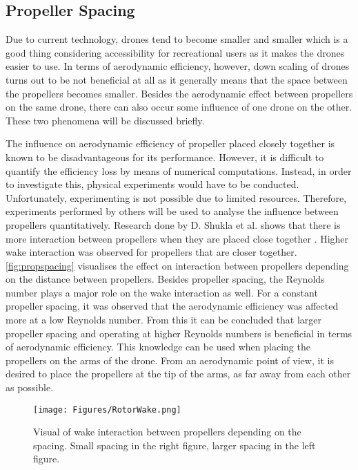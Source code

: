 \subsection{Propeller Spacing}
\label{subsec:propspacing}
Due to current technology, drones tend to become smaller and smaller which is a good thing considering accessibility for recreational users as it makes the drones easier to use. In terms of aerodynamic efficiency, however, down scaling of drones turns out to be not beneficial at all as it generally means that the space between the propellers becomes smaller. Besides the aerodynamic effect between propellers on the same drone, there can also occur some influence of one drone on the other. These two phenomena will be discussed briefly.

The influence on aerodynamic efficiency of propeller placed closely together is known to be disadvantageous for its performance. However, it is difficult to quantify the efficiency loss by means of numerical computations. Instead, in order to investigate this, physical experiments would have to be conducted. Unfortunately, experimenting is not possible due to limited resources. Therefore, experiments performed by others will be used to analyse the influence between propellers quantitatively. Research done by D. Shukla et al. shows that there is more interaction between propellers when they are placed close together \cite{wakeinteraction}. Higher wake interaction was observed for propellers that are closer together. \autoref{fig:propspacing} visualises the effect on interaction between propellers depending on the distance between propellers. Besides propeller spacing, the Reynolds number plays a major role on the wake interaction as well. For a constant propeller spacing, it was observed that the aerodynamic efficiency was affected more at a low Reynolds number. From this it can be concluded that larger propeller spacing and operating at higher Reynolds numbers is beneficial in terms of aerodynamic efficiency. This knowledge can be used when placing the propellers on the arms of the drone. From an aerodynamic point of view, it is desired to place the propellers at the tip of the arms, as far away from each other as possible.

\begin{figure}
    \centering
    \texttt{[image: Figures/RotorWake.png]}
    \caption{Visual of wake interaction between propellers depending on the spacing. Small spacing in the right figure, larger spacing in the left figure.}
    \label{fig:propspacing}
\end{figure}

